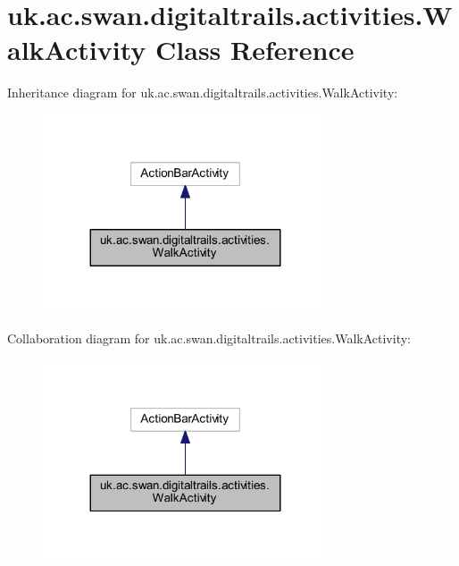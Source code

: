 \hypertarget{classuk_1_1ac_1_1swan_1_1digitaltrails_1_1activities_1_1_walk_activity}{\section{uk.\+ac.\+swan.\+digitaltrails.\+activities.\+Walk\+Activity Class Reference}
\label{classuk_1_1ac_1_1swan_1_1digitaltrails_1_1activities_1_1_walk_activity}
}


Inheritance diagram for uk.\+ac.\+swan.\+digitaltrails.\+activities.\+Walk\+Activity\+:\nopagebreak
\begin{figure}[H]
\begin{center}
\leavevmode
\includegraphics[width=239pt]{classuk_1_1ac_1_1swan_1_1digitaltrails_1_1activities_1_1_walk_activity__inherit__graph}
\end{center}
\end{figure}


Collaboration diagram for uk.\+ac.\+swan.\+digitaltrails.\+activities.\+Walk\+Activity\+:\nopagebreak
\begin{figure}[H]
\begin{center}
\leavevmode
\includegraphics[width=239pt]{classuk_1_1ac_1_1swan_1_1digitaltrails_1_1activities_1_1_walk_activity__coll__graph}
\end{center}
\end{figure}
